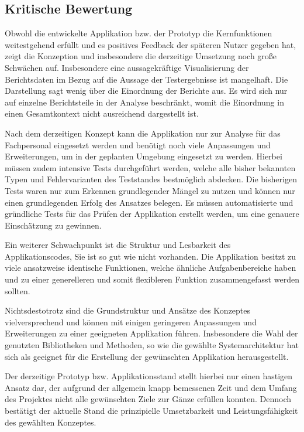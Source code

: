 \subsection{Kritische Bewertung}
\label{subsec:kritische-bewertung}

Obwohl die entwickelte Applikation bzw. der Prototyp die Kernfunktionen weitestgehend erfüllt und es positives Feedback der späteren Nutzer gegeben hat,
zeigt die Konzeption und insbesondere die derzeitige Umsetzung noch große Schwächen auf.
Insbesondere eine aussagekräftige Visualisierung der Berichtsdaten im Bezug auf die Aussage der Testergebnisse ist mangelhaft.
Die Darstellung sagt wenig über die Einordnung der Berichte aus.
Es wird sich nur auf einzelne Berichtsteile in der Analyse beschränkt, womit die Einordnung in einen Gesamtkontext nicht ausreichend dargestellt ist.

Nach dem derzeitigen Konzept kann die Applikation nur zur Analyse für das Fachpersonal eingesetzt werden und benötigt noch viele Anpassungen und Erweiterungen, um in der geplanten Umgebung eingesetzt zu werden.
Hierbei müssen zudem intensive Tests durchgeführt werden, welche alle bisher bekannten Typen und Fehlervarianten des Teststandes bestmöglich abdecken.
Die bisherigen Tests waren nur zum Erkennen grundlegender Mängel zu nutzen und können nur einen grundlegenden Erfolg des Ansatzes belegen.
Es müssen automatisierte und gründliche Tests für das Prüfen der Applikation erstellt werden, um eine genauere Einschätzung zu gewinnen.

Ein weiterer Schwachpunkt ist die Struktur und Lesbarkeit des Applikationscodes, Sie ist so gut wie nicht vorhanden.
Die Applikation besitzt zu viele ansatzweise identische Funktionen, welche ähnliche Aufgabenbereiche haben und zu einer generelleren und somit flexibleren Funktion zusammengefasst werden sollten.

Nichtsdestotrotz sind die Grundstruktur und Ansätze des Konzeptes vielversprechend und können mit einigen geringeren Anpassungen und Erweiterungen zu einer geeigneten Applikation führen.
Insbesondere die Wahl der genutzten Bibliotheken und Methoden, so wie die gewählte Systemarchitektur hat sich als geeignet für die Erstellung der gewünschten Applikation herausgestellt.

Der derzeitige Prototyp bzw. Applikationsstand stellt hierbei nur einen hastigen Ansatz dar, der aufgrund der allgemein knapp bemessenen Zeit und dem Umfang des Projektes nicht alle gewünschten Ziele
zur Gänze erfüllen konnten.
Dennoch bestätigt der aktuelle Stand die prinzipielle Umsetzbarkeit und Leistungsfähigkeit des gewählten Konzeptes.





